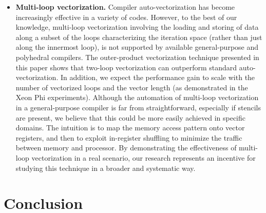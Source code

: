 \begin{itemize}
\item \textbf{Multi-loop vectorization.} Compiler auto-vectorization has become increasingly effective in a variety of codes. However, to the best of our knowledge, multi-loop vectorization involving the loading and storing of data along a subset of the loops characterizing the iteration space (rather than just along the innermost loop), is not supported by available general-purpose and polyhedral compilers. The outer-product vectorization technique presented in this paper shows that two-loop vectorization can outperform standard auto-vectorization. In addition, we expect the performance gain to scale with the number of vectorized loops and the vector length (as demonstrated in  the Xeon Phi experiments). Although the automation of multi-loop vectorization in a general-purpose compiler is far from straightforward, especially if stencils are present, we believe that this could be more easily achieved in specific domains. The intuition is to map the memory access pattern onto vector registers, and then to exploit in-register shuffling to minimize the traffic between memory and processor. By demonstrating the effectiveness of multi-loop vectorization in a real scenario, our research represents an incentive for studying this technique in a broader and systematic way.
\end{itemize}

\section{Conclusion}